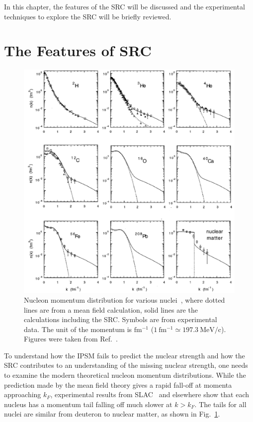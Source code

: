  In this chapter, the features of the SRC will be discussed and the experimental techniques to explore the SRC will be briefly reviewed. 

\section{The Features of SRC}
\begin{figure}[!ht]
  \begin{center}
    \includegraphics[type=pdf,ext=.pdf,read=.pdf,width=0.80\linewidth]{./figures/physics/Claudio_Distributions}
    \caption[Nucleon momentum distribution]{\footnotesize{Nucleon momentum distribution for various nuclei~\cite{PhysRevC.53.1689}, where dotted lines are from a mean field calculation, solid lines are the calculations including the SRC. Symbols are from experimental data. The unit of the momentum is $\mathrm{fm^{-1}}$ ($\mathrm{1~fm^{-1}\simeq 197.3~MeV/c}$). Figures were taken from Ref.~\cite{PhysRevC.53.1689}.}}
    \label{mom_dis_ox}
  \end{center}
\end{figure}

To understand how the IPSM fails to predict the nuclear strength and how the SRC contributes to an understanding of the missing nuclear strength, one needs to examine the modern theoretical nucleon momentum distributions. While the prediction made by the mean field theory gives a rapid fall-off at momenta approaching $k_{F}$, experimental results from SLAC~\cite{PhysRevC.53.1689} and elsewhere show that each nucleus has a momentum tail falling off much slower at $k>k_{F}$. The tails for all nuclei are similar from deuteron to nuclear matter, as shown in Fig.~\ref{mom_dis_ox}. 

